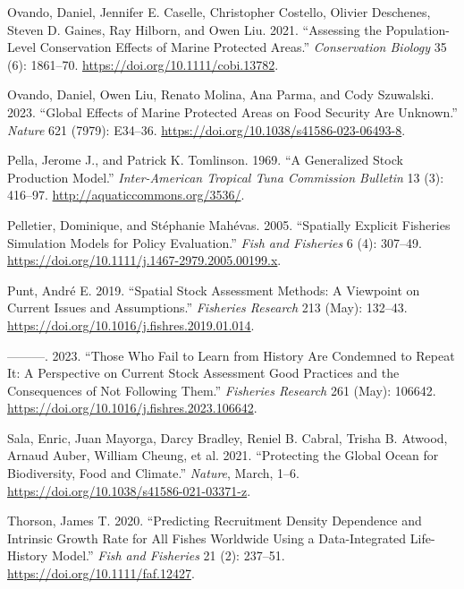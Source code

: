 \documentclass[
  default,
  lineno,
  referee]{sn-jnl}
\newlength{\cslhangindent}
\newenvironment{CSLReferences}[2] %
 {\begin{list}{}{%
  \setlength{\itemindent}{0pt}
  \setlength{\leftmargin}{0pt}
  \setlength{\parsep}{0pt}
  \ifodd #1
   \setlength{\leftmargin}{\cslhangindent}
   \setlength{\itemindent}{-1\cslhangindent}
  \fi
  \setlength{\itemsep}{#2\baselineskip}}}
 {\end{list}}
\begin{document}
\begin{CSLReferences}{1}{0}
Ovando, Daniel, Jennifer E. Caselle, Christopher Costello, Olivier
Deschenes, Steven D. Gaines, Ray Hilborn, and Owen Liu. 2021.
{``Assessing the Population{-}Level Conservation Effects of Marine
Protected Areas.''} \emph{Conservation Biology} 35 (6): 1861--70.
\url{https://doi.org/10.1111/cobi.13782}.

Ovando, Daniel, Owen Liu, Renato Molina, Ana Parma, and Cody Szuwalski.
2023. {``Global Effects of Marine Protected Areas on Food Security Are
Unknown.''} \emph{Nature} 621 (7979): E34--36.
\url{https://doi.org/10.1038/s41586-023-06493-8}.

Pella, Jerome J., and Patrick K. Tomlinson. 1969. {``A Generalized Stock
Production Model.''} \emph{Inter-American Tropical Tuna Commission
Bulletin} 13 (3): 416--97. \url{http://aquaticcommons.org/3536/}.

Pelletier, Dominique, and Stéphanie Mahévas. 2005. {``Spatially Explicit
Fisheries Simulation Models for Policy Evaluation.''} \emph{Fish and
Fisheries} 6 (4): 307--49.
\url{https://doi.org/10.1111/j.1467-2979.2005.00199.x}.

Punt, André E. 2019. {``Spatial Stock Assessment Methods: A Viewpoint on
Current Issues and Assumptions.''} \emph{Fisheries Research} 213 (May):
132--43. \url{https://doi.org/10.1016/j.fishres.2019.01.014}.

---------. 2023. {``Those Who Fail to Learn from History Are Condemned
to Repeat It: A Perspective on Current Stock Assessment Good Practices
and the Consequences of Not Following Them.''} \emph{Fisheries Research}
261 (May): 106642. \url{https://doi.org/10.1016/j.fishres.2023.106642}.

Sala, Enric, Juan Mayorga, Darcy Bradley, Reniel B. Cabral, Trisha B.
Atwood, Arnaud Auber, William Cheung, et al. 2021. {``Protecting the
Global Ocean for Biodiversity, Food and Climate.''} \emph{Nature},
March, 1--6. \url{https://doi.org/10.1038/s41586-021-03371-z}.

Thorson, James T. 2020. {``Predicting Recruitment Density Dependence and
Intrinsic Growth Rate for All Fishes Worldwide Using a Data-Integrated
Life-History Model.''} \emph{Fish and Fisheries} 21 (2): 237--51.
\url{https://doi.org/10.1111/faf.12427}.


\end{CSLReferences}
\end{document}
